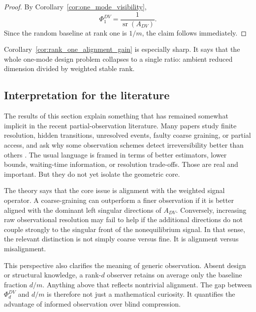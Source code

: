 \documentclass[11pt,a4paper]{article}
\numberwithin{equation}{section}
\theoremstyle{thmcompact}
\theoremstyle{remark}
\begin{document}
\begin{proof}
By Corollary~\ref{cor:one_mode_visibility},
\begin{equation}
\Phi_1^{DV}=\frac{1}{\operatorname{sr}(A_{DV})}.
\end{equation}
Since the random baseline at rank one is \(1/m\), the claim follows immediately.
\end{proof}

Corollary~\ref{cor:rank_one_alignment_gain} is especially sharp. It says that the whole one-mode design problem collapses to a single ratio: ambient reduced dimension divided by weighted stable rank.

\subsection{Interpretation for the literature}

The results of this section explain something that has remained somewhat implicit in the recent partial-observation literature. Many papers study finite resolution, hidden transitions, unresolved events, faulty coarse graining, or partial access, and ask why some observation schemes detect irreversibility better than others \cite{BaiesiNishiyamaFalasco2023,BlomSongVougaGodecMakarov2025,FritzErtelSeifert2024,Harunari2024,vanderMeerSaito2025}. The usual language is framed in terms of better estimators, lower bounds, waiting-time information, or resolution trade-offs. Those are real and important. But they do not yet isolate the geometric core.

The theory says that the core issue is alignment with the weighted signal operator. A coarse-graining can outperform a finer observation if it is better aligned with the dominant left singular directions of \(A_{DV}\). Conversely, increasing raw observational resolution may fail to help if the additional directions do not couple strongly to the singular front of the nonequilibrium signal. In that sense, the relevant distinction is not simply coarse versus fine. It is alignment versus misalignment.

This perspective also clarifies the meaning of generic observation. Absent design or structural knowledge, a rank-\(d\) observer retains on average only the baseline fraction \(d/m\). Anything above that reflects nontrivial alignment. The gap between \(\Phi_d^{DV}\) and \(d/m\) is therefore not just a mathematical curiosity. It quantifies the advantage of informed observation over blind compression.
\end{document}
